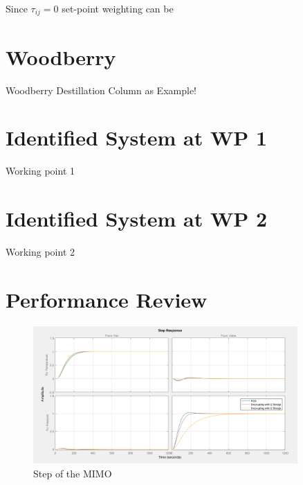 Since $\tau_{ij} = 0$ set-point weighting can be 



\section{Woodberry}%
\label{c:fotd:s:woodberry}

Woodberry Destillation Column as Example!

\section{Identified System at WP 1}%
\label{c:fotd:s:wp1}

Working point 1

\section{Identified System at WP 2}%
\label{c:fotd:s:wp1}

Working point 2

\section{Performance Review} %
\label{c:fotd:s:performance_review}

\begin{figure}[H]
\begin{minipage}[b]{\textwidth}
\centering
\includegraphics[width=0.9\textwidth]{./Graphics/Step_MATLAB.png}
\caption{Step of the MIMO}
\label{c:fotd:f:mimo_step}
\end{minipage}
\end{figure}

